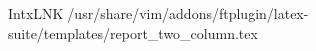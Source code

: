 IntxLNK/ u s r / s h a r e / v i m / a d d o n s / f t p l u g i n / l a t e x - s u i t e / t e m p l a t e s / r e p o r t _ t w o _ c o l u m n . t e x 